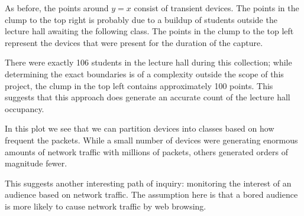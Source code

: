 As before, the points around \(y=x\) consist of transient devices.
The points in the clump to the top right is probably due to a buildup of students outside the lecture hall awaiting the following class.
The points in the clump to the top left represent the devices that were present for the duration of the capture.
	
There were exactly 106 students in the lecture hall during this collection; while determining the exact boundaries is of a complexity outside the scope of this project, the clump in the top left contains approximately 100 points.
This suggests that this approach does generate an accurate count of the lecture hall occupancy.


In this plot we see that we can partition devices into classes based on how frequent the packets.
While a small number of devices were generating enormous amounts of network traffic with millions of packets, others generated orders of magnitude fewer.
	
This suggests another interesting path of inquiry: monitoring the interest of an audience based on network traffic.
The assumption here is that a bored audience is more likely to cause network traffic by web browsing.
